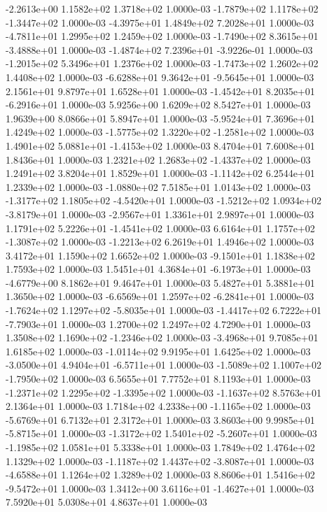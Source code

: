 -2.2613e+00  1.1582e+02  1.3718e+02  1.0000e-03
-1.7879e+02  1.1178e+02 -1.3447e+02  1.0000e-03
-4.3975e+01  1.4849e+02  7.2028e+01  1.0000e-03
-4.7811e+01  1.2995e+02  1.2459e+02  1.0000e-03
-1.7490e+02  8.3615e+01 -3.4888e+01  1.0000e-03
-1.4874e+02  7.2396e+01 -3.9226e-01  1.0000e-03
-1.2015e+02  5.3496e+01  1.2376e+02  1.0000e-03
-1.7473e+02  1.2602e+02  1.4408e+02  1.0000e-03
-6.6288e+01  9.3642e+01 -9.5645e+01  1.0000e-03
2.1561e+01 9.8797e+01 1.6528e+01  1.0000e-03
-1.4542e+01  8.2035e+01 -6.2916e+01  1.0000e-03
5.9256e+00 1.6209e+02 8.5427e+01  1.0000e-03
1.9639e+00 8.0866e+01 5.8947e+01  1.0000e-03
-5.9524e+01  7.3696e+01  1.4249e+02  1.0000e-03
-1.5775e+02  1.3220e+02 -1.2581e+02  1.0000e-03
 1.4901e+02  5.0881e+01 -1.4153e+02  1.0000e-03
8.4704e+01 7.6008e+01 1.8436e+01  1.0000e-03
 1.2321e+02  1.2683e+02 -1.4337e+02  1.0000e-03
1.2491e+02 3.8204e+01 1.8529e+01  1.0000e-03
-1.1142e+02  6.2544e+01  1.2339e+02  1.0000e-03
-1.0880e+02  7.5185e+01  1.0143e+02  1.0000e-03
-1.3177e+02  1.1805e+02 -4.5420e+01  1.0000e-03
-1.5212e+02  1.0934e+02 -3.8179e+01  1.0000e-03
-2.9567e+01  1.3361e+01  2.9897e+01  1.0000e-03
 1.1791e+02  5.2226e+01 -1.4541e+02  1.0000e-03
 6.6164e+01  1.1757e+02 -1.3087e+02  1.0000e-03
-1.2213e+02  6.2619e+01  1.4946e+02  1.0000e-03
3.4172e+01 1.1590e+02 1.6652e+02  1.0000e-03
-9.1501e+01  1.1838e+02  1.7593e+02  1.0000e-03
 1.5451e+01  4.3684e+01 -6.1973e+01  1.0000e-03
-4.6779e+00  8.1862e+01  9.4647e+01  1.0000e-03
5.4827e+01 5.3881e+01 1.3650e+02  1.0000e-03
-6.6569e+01  1.2597e+02 -6.2841e+01  1.0000e-03
-1.7624e+02  1.1297e+02 -5.8035e+01  1.0000e-03
-1.4417e+02  6.7222e+01 -7.7903e+01  1.0000e-03
1.2700e+02 1.2497e+02 4.7290e+01  1.0000e-03
 1.3508e+02  1.1690e+02 -1.2346e+02  1.0000e-03
-3.4968e+01  9.7085e+01  1.6185e+02  1.0000e-03
-1.0114e+02  9.9195e+01  1.6425e+02  1.0000e-03
-3.0500e+01  4.9404e+01 -6.5711e+01  1.0000e-03
-1.5089e+02  1.1007e+02 -1.7950e+02  1.0000e-03
6.5655e+01 7.7752e+01 8.1193e+01  1.0000e-03
-1.2371e+02  1.2295e+02 -1.3395e+02  1.0000e-03
-1.1637e+02  8.5763e+01  2.1364e+01  1.0000e-03
 1.7184e+02  4.2338e+00 -1.1165e+02  1.0000e-03
-5.6769e+01  6.7132e+01  2.3172e+01  1.0000e-03
 3.8603e+00  9.9985e+01 -5.8715e+01  1.0000e-03
-1.3172e+02  1.5401e+02 -5.2607e+01  1.0000e-03
-1.1985e+02  1.0581e+01  5.3338e+01  1.0000e-03
1.7849e+02 1.4764e+02 1.1329e+02  1.0000e-03
-1.1187e+02  1.4437e+02 -3.8087e+01  1.0000e-03
-4.6588e+01  1.1264e+02  1.3289e+02  1.0000e-03
 8.8606e+01  1.5416e+02 -9.5472e+01  1.0000e-03
 1.3412e+00  3.6116e+01 -1.4627e+01  1.0000e-03
7.5920e+01 5.0308e+01 4.8637e+01  1.0000e-03
